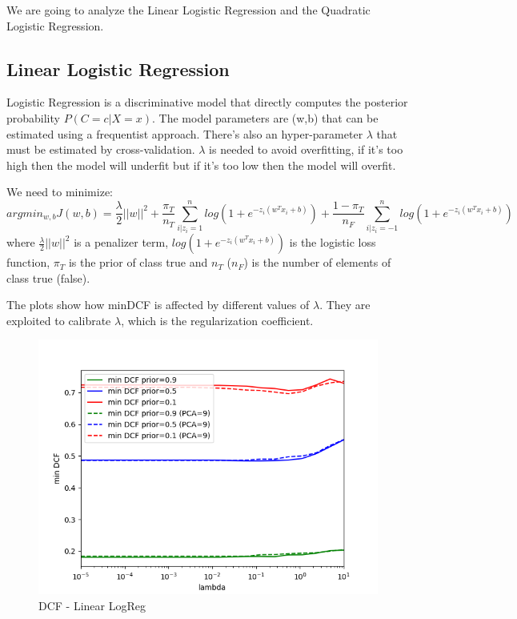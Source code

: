 \documentclass[english]{report}
\begin{document}
We are going to analyze the Linear Logistic Regression and the Quadratic Logistic Regression.
\subsection{Linear Logistic Regression}

Logistic Regression is a discriminative model that directly computes the posterior probability \(P(C=c|X=x)\).
The model parameters are (w,b) that can be estimated using a frequentist approach.
There's also an hyper-parameter $\lambda$ that must be estimated by cross-validation. $\lambda$ is needed to avoid overfitting, if it's too high then the model will
underfit but if it's too low then the model will overfit.\newline

We need to minimize:
\[argmin_{w,b} J(w,b) = \frac{\lambda}{2}||w||^2 + \frac{\pi_T}{n_T}\sum_{i|z_i=1}^{n}log(1+e^{-z_i(w^Tx_i+b)}) 
+ \frac{1 - \pi_T}{n_F}\sum_{i|z_i=-1}^{n}log(1+e^{-z_i(w^Tx_i+b)})\]
where \(\frac{\lambda}{2}||w||^2\) is a penalizer term, \(log(1+e^{-z_i(w^Tx_i+b)})\) is the logistic
loss function, $\pi_T$ is the prior of class true and $n_T$ ($n_F$) is the number of elements of class
true (false). \newline

The plots show how minDCF is affected by different values of $\lambda$.
They are exploited to calibrate $\lambda$, which is the regularization coefficient.

\begin{figure}[H]
    \centering
    \includegraphics[scale=0.5]{../../images/validation/LR_PCA_minDCF_comparison}
    \caption{DCF - Linear LogReg}
    \label{fig:DCF_LinearLogReg_valid}
\end{figure}
\end{document}
